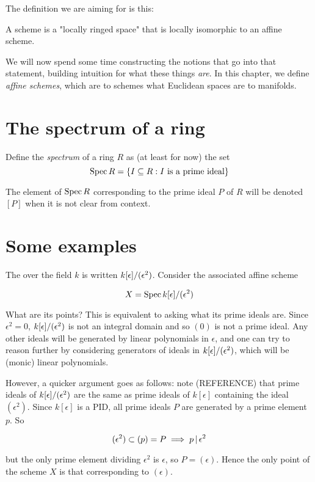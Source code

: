 \medskip\noindent The definition we are aiming for is this:

\begin{adefinition}[Target]
  A scheme is a "locally ringed space" that is locally isomorphic to an affine
  scheme.
\end{adefinition}

We will now spend some time constructing the notions that go into that
statement, building intuition for what these things \emph{are}. In this chapter,
we define \emph{affine schemes}, which are to schemes what Euclidean spaces are
to manifolds.

\section{The spectrum of a ring}
\label{sec:the-spectrum-of-a-ring}

\begin{adefinition}[Provisional]
 Define the \emph{spectrum} of a ring $R$ as (at least for now) the set
\[ \operatorname{Spec} R = \{ I \subseteq R : I \text{ is a prime ideal} \} \]
\end{adefinition}

The element of $\operatorname{Spec} R$ corresponding to the prime ideal $P$ of $R$ will be
denoted $[P]$ when it is not clear from context.

\section{Some examples}
\label{sec:examples-of-affine-schemes}

\begin{example}
  The  over the field $k$ is written
  ${k}[\epsilon]/(\epsilon^2)$. Consider the associated affine scheme

  \[ X = \operatorname{Spec} {k}[\epsilon]/(\epsilon^2) \]

  \medskip\noindent What are its points? This is equivalent to asking what its
  prime ideals are. Since $\epsilon^2 = 0$, ${k}[\epsilon]/(\epsilon^2)$ is not an integral domain
  and so $(0)$ is not a prime ideal. Any other ideals will be generated by
  linear polynomials in $\epsilon$, and one can try to reason further by
  considering generators of ideals in ${k}[\epsilon]/(\epsilon^2)$, which will be (monic) linear
  polynomials.

  \medskip\noindent However, a quicker argument goes as follows: note
  (REFERENCE) that prime ideals of ${k}[\epsilon]/(\epsilon^2)$ are the same as prime ideals of
  $k[\epsilon]$ containing the ideal $(\epsilon^2)$. Since $k[\epsilon]$ is a
  PID, all prime ideals $P$ are generated by a prime element $p$. So

  \[ (\epsilon^2) \subset (p) = P \implies p \mathop{|} \epsilon^2 \]

  \medskip\noindent but the only prime element dividing $\epsilon^2$ is
  $\epsilon$, so $P = (\epsilon)$. Hence the only point of the scheme $X$ is
  that corresponding to $(\epsilon)$.
\end{example}
